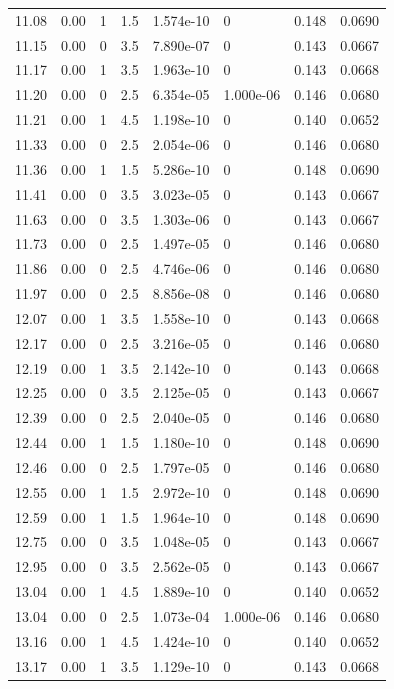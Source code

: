 \documentclass[preview]{standalone}
\begin{document}
{{{\begin{tabular}{L{1.2cm}C{1.2cm} C{0.3cm}C{0.5cm} C{1.4cm}C{1.4cm} C{1.4cm}C{1.4cm}}
  11.08  &  0.00  & 1     & 1.5 &  1.574e-10  & 0  & 0.148 &  0.0690   \\ 
  11.15  &  0.00  & 0     & 3.5 &  7.890e-07  & 0  & 0.143 &  0.0667   \\ 
  11.17  &  0.00  & 1     & 3.5 &  1.963e-10  & 0  & 0.143 &  0.0668   \\ 
  11.20  &  0.00  & 0     & 2.5 &  6.354e-05  & 1.000e-06  & 0.146 &  0.0680   \\ 
  11.21  &  0.00  & 1     & 4.5 &  1.198e-10  & 0  & 0.140 &  0.0652   \\ 
  11.33  &  0.00  & 0     & 2.5 &  2.054e-06  & 0  & 0.146 &  0.0680   \\ 
  11.36  &  0.00  & 1     & 1.5 &  5.286e-10  & 0  & 0.148 &  0.0690   \\ 
  11.41  &  0.00  & 0     & 3.5 &  3.023e-05  & 0  & 0.143 &  0.0667   \\ 
  11.63  &  0.00  & 0     & 3.5 &  1.303e-06  & 0  & 0.143 &  0.0667   \\ 
  11.73  &  0.00  & 0     & 2.5 &  1.497e-05  & 0  & 0.146 &  0.0680   \\ 
  11.86  &  0.00  & 0     & 2.5 &  4.746e-06  & 0  & 0.146 &  0.0680   \\ 
  11.97  &  0.00  & 0     & 2.5 &  8.856e-08  & 0  & 0.146 &  0.0680   \\ 
  12.07  &  0.00  & 1     & 3.5 &  1.558e-10  & 0  & 0.143 &  0.0668   \\ 
  12.17  &  0.00  & 0     & 2.5 &  3.216e-05  & 0  & 0.146 &  0.0680   \\ 
  12.19  &  0.00  & 1     & 3.5 &  2.142e-10  & 0  & 0.143 &  0.0668   \\ 
  12.25  &  0.00  & 0     & 3.5 &  2.125e-05  & 0  & 0.143 &  0.0667   \\ 
  12.39  &  0.00  & 0     & 2.5 &  2.040e-05  & 0  & 0.146 &  0.0680   \\ 
  12.44  &  0.00  & 1     & 1.5 &  1.180e-10  & 0  & 0.148 &  0.0690   \\ 
  12.46  &  0.00  & 0     & 2.5 &  1.797e-05  & 0  & 0.146 &  0.0680   \\ 
  12.55  &  0.00  & 1     & 1.5 &  2.972e-10  & 0  & 0.148 &  0.0690   \\ 
  12.59  &  0.00  & 1     & 1.5 &  1.964e-10  & 0  & 0.148 &  0.0690   \\ 
  12.75  &  0.00  & 0     & 3.5 &  1.048e-05  & 0  & 0.143 &  0.0667   \\ 
  12.95  &  0.00  & 0     & 3.5 &  2.562e-05  & 0  & 0.143 &  0.0667   \\ 
  13.04  &  0.00  & 1     & 4.5 &  1.889e-10  & 0  & 0.140 &  0.0652   \\ 
  13.04  &  0.00  & 0     & 2.5 &  1.073e-04  & 1.000e-06  & 0.146 &  0.0680   \\ 
  13.16  &  0.00  & 1     & 4.5 &  1.424e-10  & 0  & 0.140 &  0.0652   \\ 
  13.17  &  0.00  & 1     & 3.5 &  1.129e-10  & 0  & 0.143 &  0.0668   \\ 
\hline 
\end{tabular} 

}}}
\end{document}
